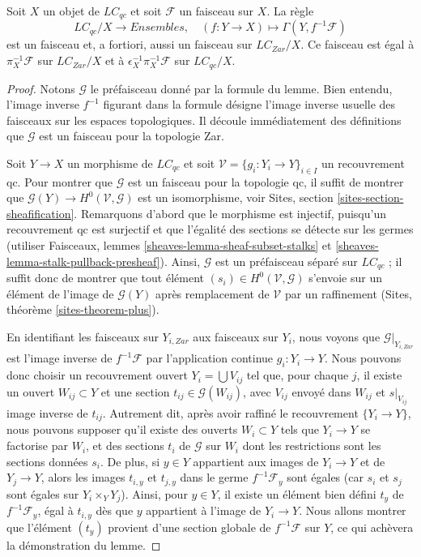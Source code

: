 \begin{lemma}
\label{lemma-describe-pullback-pi}
Soit $X$ un objet de $\textit{LC}_{qc}$ et soit $\mathcal{F}$ un faisceau
sur $X$. La règle
$$
\textit{LC}_{qc}/X \longrightarrow \textit{Ensembles},\quad
(f : Y \to X) \longmapsto \Gamma(Y, f^{-1}\mathcal{F})
$$
est un faisceau et, a fortiori, aussi un faisceau sur
$\textit{LC}_{Zar}/X$. Ce faisceau est égal à
$\pi_X^{-1}\mathcal{F}$ sur $\textit{LC}_{Zar}/X$ et à
$\epsilon_X^{-1}\pi_X^{-1}\mathcal{F}$ sur $\textit{LC}_{qc}/X$.
\end{lemma}

\begin{proof}
Notons $\mathcal{G}$ le préfaisceau donné par la formule du lemme.
Bien entendu, l'image inverse $f^{-1}$ figurant dans la formule désigne
l'image inverse usuelle des faisceaux sur les espaces topologiques.
Il découle immédiatement des définitions que $\mathcal{G}$ est un faisceau
pour la topologie Zar.

\medskip\noindent
Soit $Y \to X$ un morphisme de $\textit{LC}_{qc}$ et soit
$\mathcal{V} = \{g_i : Y_i \to Y\}_{i \in I}$ un recouvrement qc.
Pour montrer que $\mathcal{G}$ est un faisceau pour la topologie qc, il
suffit de montrer que
$\mathcal{G}(Y) \to H^0(\mathcal{V}, \mathcal{G})$
est un isomorphisme, voir Sites, section
\ref{sites-section-sheafification}. Remarquons d'abord que le morphisme est
injectif, puisqu'un recouvrement qc est surjectif et que l'égalité des
sections se détecte sur les germes (utiliser Faisceaux, lemmes
\ref{sheaves-lemma-sheaf-subset-stalks} et
\ref{sheaves-lemma-stalk-pullback-presheaf}). Ainsi, $\mathcal{G}$ est un
préfaisceau séparé sur $\textit{LC}_{qc}$ ; il suffit donc de montrer que
tout élément
$(s_i) \in H^0(\mathcal{V}, \mathcal{G})$
s'envoie sur un élément de l'image de $\mathcal{G}(Y)$ après remplacement de
$\mathcal{V}$ par un raffinement
(Sites, théorème \ref{sites-theorem-plus}).

\medskip\noindent
En identifiant les faisceaux sur $Y_{i, Zar}$ aux faisceaux sur $Y_i$, nous
voyons que $\mathcal{G}|_{Y_{i, Zar}}$ est l'image inverse de
$f^{-1}\mathcal{F}$ par l'application continue $g_i : Y_i \to Y$. Nous
pouvons donc choisir un recouvrement ouvert $Y_i = \bigcup V_{ij}$ tel que,
pour chaque $j$, il existe un ouvert $W_{ij} \subset Y$ et une section
$t_{ij} \in \mathcal{G}(W_{ij})$, avec $V_{ij}$ envoyé dans $W_{ij}$ et
$s|_{V_{ij}}$ image inverse de $t_{ij}$. Autrement dit, après avoir raffiné
le recouvrement $\{Y_i \to Y\}$, nous pouvons supposer qu'il existe des
ouverts $W_i \subset Y$ tels que $Y_i \to Y$ se factorise par $W_i$, et des
sections $t_i$ de $\mathcal{G}$ sur $W_i$ dont les restrictions sont les
sections données $s_i$. De plus, si $y \in Y$ appartient aux images de
$Y_i \to Y$ et de $Y_j \to Y$, alors les images $t_{i, y}$ et $t_{j, y}$
dans le germe $f^{-1}\mathcal{F}_y$ sont égales (car $s_i$ et $s_j$ sont
égales sur $Y_i \times_Y Y_j$). Ainsi, pour $y \in Y$, il existe un élément
bien défini $t_y$ de $f^{-1}\mathcal{F}_y$, égal à $t_{i, y}$ dès que $y$
appartient à l'image de $Y_i \to Y$.
Nous allons montrer que l'élément $(t_y)$ provient d'une section globale de
$f^{-1}\mathcal{F}$ sur $Y$, ce qui achèvera la démonstration du lemme.


\end{proof}
